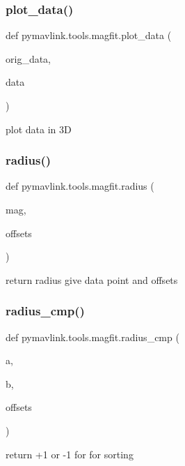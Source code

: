 \subsubsection{\texorpdfstring{plot\+\_\+data()}{plot\_data()}}
{\footnotesize\ttfamily def pymavlink.\+tools.\+magfit.\+plot\+\_\+data (\begin{DoxyParamCaption}\item[{}]{orig\+\_\+data,  }\item[{}]{data }\end{DoxyParamCaption})}

\begin{DoxyVerb}plot data in 3D\end{DoxyVerb}
 \mbox{\label{namespacepymavlink_1_1tools_1_1magfit_a62287ea1457f17318d050e233a94c7d9}} 
\subsubsection{\texorpdfstring{radius()}{radius()}}
{\footnotesize\ttfamily def pymavlink.\+tools.\+magfit.\+radius (\begin{DoxyParamCaption}\item[{}]{mag,  }\item[{}]{offsets }\end{DoxyParamCaption})}

\begin{DoxyVerb}return radius give data point and offsets\end{DoxyVerb}
 \mbox{\label{namespacepymavlink_1_1tools_1_1magfit_aecea0b6954ec65248c3cd767cae448eb}} 
\subsubsection{\texorpdfstring{radius\+\_\+cmp()}{radius\_cmp()}}
{\footnotesize\ttfamily def pymavlink.\+tools.\+magfit.\+radius\+\_\+cmp (\begin{DoxyParamCaption}\item[{}]{a,  }\item[{}]{b,  }\item[{}]{offsets }\end{DoxyParamCaption})}

\begin{DoxyVerb}return +1 or -1 for for sorting\end{DoxyVerb}
 